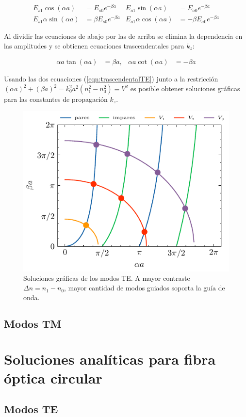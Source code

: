 \begin{align*}
E_{s1}\cos(\alpha a) &= E_{s0} e^{-\beta a} & E_{a1}\sin(\alpha a) &= E_{a0} e^{-\beta a}
\\
E_{s1}\alpha\sin(\alpha a) &= \beta E_{s0} e^{-\beta a} & E_{a1}\alpha\cos(\alpha a) &= -\beta E_{a0} e^{-\beta a}
\end{align*}

Al dividir las ecuaciones de abajo por las de arriba se elimina la dependencia en las amplitudes y se obtienen ecuaciones trascendentales para $k_z$:

\begin{align}
	\alpha a \tan(\alpha a) &= \beta a, & \alpha a \cot(\alpha a) &= -\beta a \label{eqn:trascendentalTE}
\end{align}

Usando las dos ecuaciones (\ref{eqn:trascendentalTE}) junto a la restricción $(\alpha a)^2 + (\beta a)^2 = k_0^2 a^2(n_1^2 - n_0^2) \equiv V^2$ es posible obtener soluciones gráficas para las constantes de propagación $k_z$.

\begin{figure}[H]
	\centering
	\includegraphics[width=0.7\linewidth]{media/slabgraphical}
	\caption[Soluciones gráficas de los modos TE]{Soluciones gráficas de los modos TE. A mayor contraste $\Delta n = n_1-n_0$, mayor cantidad de modos guiados soporta la guía de onda.}
\end{figure}
\subsection{Modos TM}
\section{Soluciones analíticas para fibra óptica circular}
\subsection{Modos TE}
